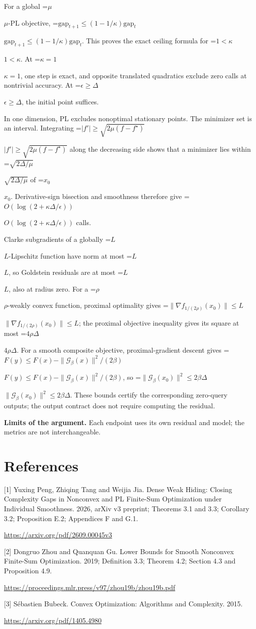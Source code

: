 \documentclass[10pt,a4paper]{article}
\newcommand{\AtlasMath}[1]{\par\begingroup\centering\setbox0=\hbox{$\displaystyle #1$}\ifdim\wd0>1.4\linewidth\typeout{ATLAS WIDE FORMULA: \the\wd0}\fi\ifdim\wd0>\linewidth\resizebox{\linewidth}{!}{\box0}\else\box0\fi\par\endgroup}
\newcommand{\AtlasInlineMath}[1]{\begingroup\setbox0=\hbox{$#1$}\ifdim\wd0>.4\linewidth\endgroup\AtlasMath{#1}\else\endgroup$#1$\fi}
\begin{document}
For a global \AtlasInlineMath{\mu}-PL objective,
\AtlasInlineMath{\mathrm{gap}_{t+1}\le(1-1/\kappa)\mathrm{gap}_t}.
This proves the exact ceiling formula for \AtlasInlineMath{1<\kappa}. At \AtlasInlineMath{\kappa=1}, one step is exact, and opposite translated quadratics exclude zero calls at nontrivial accuracy. At \AtlasInlineMath{\epsilon\ge\Delta}, the initial point suffices.

In one dimension, PL excludes nonoptimal stationary points. The minimizer set is an interval. Integrating
\AtlasInlineMath{|f'|\ge\sqrt{2\mu(f-f^\star)}}
along the decreasing side shows that a minimizer lies within \AtlasInlineMath{\sqrt{2\Delta/\mu}} of \AtlasInlineMath{x_0}. Derivative-sign bisection and smoothness therefore give \AtlasInlineMath{O(\log(2+\kappa\Delta/\epsilon))} calls.

Clarke subgradients of a globally \AtlasInlineMath{L}-Lipschitz function have norm at most \AtlasInlineMath{L}, so Goldstein residuals are at most \AtlasInlineMath{L}, also at radius zero. For a \AtlasInlineMath{\rho}-weakly convex function, proximal optimality gives
\AtlasInlineMath{\|\nabla f_{1/(2\rho)}(x_0)\|\le L}; the proximal objective inequality gives its square at most \AtlasInlineMath{4\rho\Delta}.
For a smooth composite objective, proximal-gradient descent gives
\AtlasInlineMath{F(y)\le F(x)-\|\mathcal G_\beta(x)\|^2/(2\beta)},
so \AtlasInlineMath{\|\mathcal G_\beta(x_0)\|^2\le2\beta\Delta}.
These bounds certify the corresponding zero-query outputs; the output contract does not require computing the residual.

\textbf{Limits of the argument.} Each endpoint uses its own residual and model; the metrics are not interchangeable.

\section{References}
[1] Yuxing Peng, Zhiqing Tang and Weijia Jia. Dense Weak Hiding: Closing Complexity Gaps in Nonconvex and PL Finite-Sum Optimization under Individual Smoothness. 2026, arXiv v3 preprint; Theorems 3.1 and 3.3; Corollary 3.2; Proposition E.2; Appendices F and G.1.

\url{https://arxiv.org/pdf/2609.00045v3}

[2] Dongruo Zhou and Quanquan Gu. Lower Bounds for Smooth Nonconvex Finite-Sum Optimization. 2019; Definition 3.3; Theorem 4.2; Section 4.3 and Proposition 4.9.

\url{https://proceedings.mlr.press/v97/zhou19b/zhou19b.pdf}

[3] Sébastien Bubeck. Convex Optimization: Algorithms and Complexity. 2015.

\url{https://arxiv.org/pdf/1405.4980}
\end{document}
